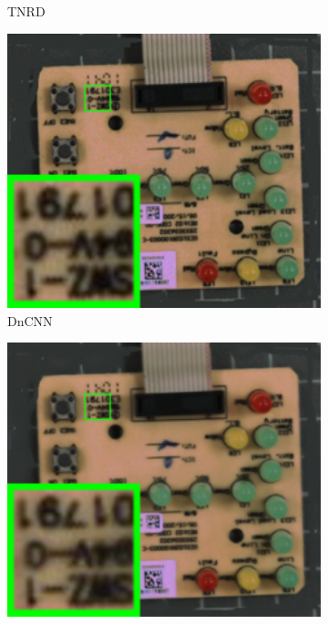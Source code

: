 \begin{figure}
\begin{subfigure}[t]{0.19\textwidth}
		\caption{TNRD}
    \end{subfigure}
    \hfill
    \begin{subfigure}[t]{0.19\textwidth}
        \centering
        \includegraphics[width=1\textwidth]{images/guided/nc/resize_br_DnCNN_circuit.png}
		\caption{DnCNN}
    \end{subfigure}
    \hfill
    \begin{subfigure}[t]{0.19\textwidth}
        \centering
        \includegraphics[width=1\textwidth]{images/guided/nc/resize_br_NI_circuit.png}

\end{subfigure}
\end{figure}
